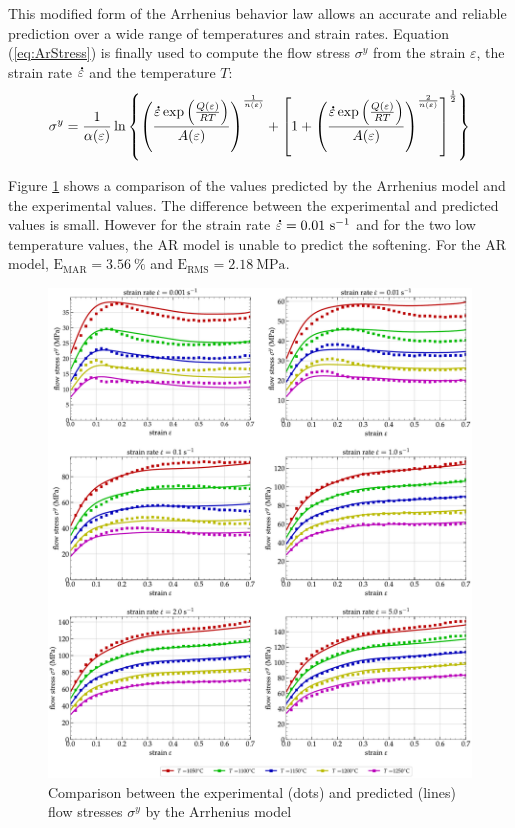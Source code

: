 \documentclass[metals,article,submit,pdftex,moreauthors]{Definitions/mdpi}
\DeclareRobustCommand{\mdot}[1]{\accentset{\mbox{\bfseries .}}{#1}}
\DeclareRobustCommand{\RMSE}{\text{E}_\text{RMS}}
\DeclareRobustCommand{\MARE}{\text{E}_\text{MAR}}
\DeclareRobustCommand{\ps}{\text{s}^{-1}}
\DeclareRobustCommand{\MPa}{\text{MPa}}
\begin{document}
This modified form of the Arrhenius behavior law allows an accurate and reliable prediction over a wide range of temperatures and strain rates.
Equation (\ref{eq:ArStress}) is finally used to compute the flow stress $\sigma^y$ from the strain $\varepsilon$, the strain rate $\mdot\varepsilon$ and the temperature $T$:
\begin{equation}
\sigma^y = \frac{1}{\alpha(\varepsilon)} \ln\left\{\left(\frac{\mdot\varepsilon \exp{\left(\frac{Q(\varepsilon)}{RT}\right)}}{A(\varepsilon)}\right)^{\frac{1}{n(\varepsilon)}} + \left[1 + \left(\frac{\mdot\varepsilon \exp{\left(\frac{Q(\varepsilon)}{RT}\right)}}{A(\varepsilon)}\right)^{\frac{2}{n(\varepsilon)}}\right]^{\frac{1}{2}}\right\}
\label{eq:ArStress}
\end{equation}

Figure \ref{fig:CompExp-AR-6} shows a comparison of the values predicted by the Arrhenius model and the experimental values.
The difference between the experimental and predicted values is small.
However for the strain rate $\mdot\varepsilon = 0.01~\ps$ and for the two low temperature values, the AR model is unable to predict the softening.
For the AR model, $\MARE=3.56~\%$ and $\RMSE=2.18~\MPa$.
\begin{figure}[!ht]
\centering
\includegraphics[width=\columnwidth]
{Figures/CompExp-AR-6}
\caption{Comparison between the experimental (dots) and predicted (lines) flow stresses $\sigma^y$ by the Arrhenius model}
\label{fig:CompExp-AR-6}
\end{figure}
\end{document}
